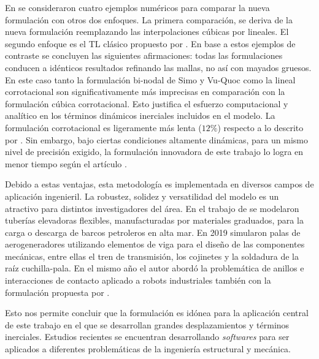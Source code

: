 En \cite{Le2014} se consideraron cuatro ejemplos numéricos para comparar la nueva formulación con otros dos enfoques. La primera comparación, se deriva de la nueva formulación reemplazando las interpolaciones cúbicas por lineales. El segundo enfoque es el TL clásico propuesto por \cite{simo1988dynamics}. En base a estos ejemplos de contraste se concluyen las siguientes afirmaciones: todas las formulaciones conducen a idénticos resultados refinando las mallas, no así con mayados gruesos. En este caso tanto la formulación bi-nodal de Simo y Vu-Quoc como la lineal corrotacional son significativamente más imprecisas en comparación con la formulación cúbica corrotacional. Esto justifica el esfuerzo computacional y analítico en los términos dinámicos inerciales incluidos en el modelo. La formulación corrotacional es ligeramente más lenta ($12\%$) respecto a lo descrito por \cite{simo1988dynamics}. Sin embargo, bajo ciertas condiciones altamente dinámicas, para un mismo nivel de precisión exigido, la formulación innovadora de este trabajo lo logra en menor tiempo según el artículo \citep{Le2014}.  

Debido a estas ventajas, esta metodología es implementada en diversos campos de aplicación ingenieril. La robustez, solidez y versatilidad del modelo es un atractivo para distintos investigadores del área. En el trabajo de \cite{albino2018co} se modelaron tuberías elevadoras flexibles, manufacturadas por materiales graduados, para la carga o descarga de barcos petroleros en alta mar. En 2019 \cite{asadi2019multibody} simularon palas de aerogeneradores utilizando elementos de viga para el diseño de las componentes mecánicas, entre ellas el tren de transmisión, los cojinetes y la soldadura de la raíz cuchilla-pala. En el mismo año el autor \cite{barzanooni2018modeling} abordó la problemática de anillos e interacciones de contacto aplicado a robots industriales también con la formulación propuesta por \cite{Le2014}.

Esto nos permite concluir que la formulación es idónea para la aplicación central de este trabajo en el que se desarrollan grandes desplazamientos y términos inerciales. Estudios recientes se encuentran desarrollando \textit{softwares} para ser aplicados a diferentes problemáticas de la ingeniería estructural y mecánica.

 

